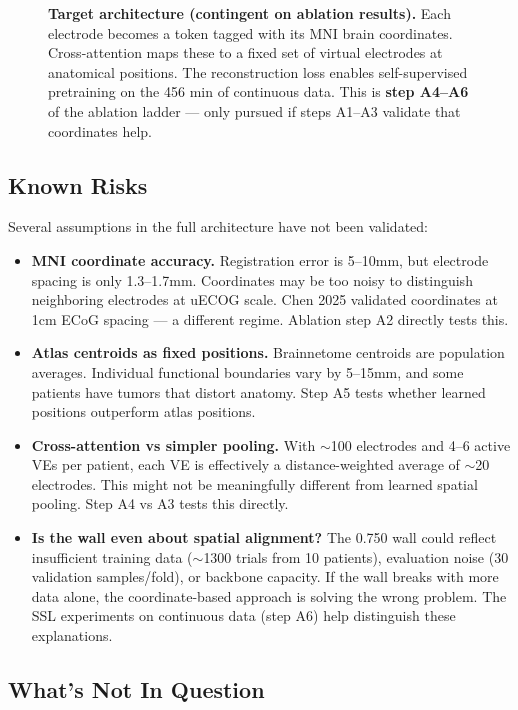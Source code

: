 \documentclass[11pt]{article}
\begin{document}
\begin{figure}[ht]
\begin{tikzpicture}
\end{tikzpicture}
\caption{\textbf{Target architecture (contingent on ablation results).} Each electrode becomes a token tagged with its MNI brain coordinates. Cross-attention maps these to a fixed set of virtual electrodes at anatomical positions. The reconstruction loss enables self-supervised pretraining on the 456 min of continuous data. This is \textbf{step A4--A6} of the ablation ladder --- only pursued if steps A1--A3 validate that coordinates help.}
\label{fig:v12}
\end{figure}

\subsection{Known Risks}

Several assumptions in the full architecture have not been validated:

\begin{itemize}[nosep]
    \item \textbf{MNI coordinate accuracy.} Registration error is 5--10mm, but electrode spacing is only 1.3--1.7mm. Coordinates may be too noisy to distinguish neighboring electrodes at uECOG scale. Chen 2025 validated coordinates at 1cm ECoG spacing --- a different regime. Ablation step A2 directly tests this.
    \item \textbf{Atlas centroids as fixed positions.} Brainnetome centroids are population averages. Individual functional boundaries vary by 5--15mm, and some patients have tumors that distort anatomy. Step A5 tests whether learned positions outperform atlas positions.
    \item \textbf{Cross-attention vs simpler pooling.} With $\sim$100 electrodes and 4--6 active VEs per patient, each VE is effectively a distance-weighted average of $\sim$20 electrodes. This might not be meaningfully different from learned spatial pooling. Step A4 vs A3 tests this directly.
    \item \textbf{Is the wall even about spatial alignment?} The 0.750 wall could reflect insufficient training data ($\sim$1300 trials from 10 patients), evaluation noise (30 validation samples/fold), or backbone capacity. If the wall breaks with more data alone, the coordinate-based approach is solving the wrong problem. The SSL experiments on continuous data (step A6) help distinguish these explanations.
\end{itemize}

\subsection{What's Not In Question}
\end{document}
